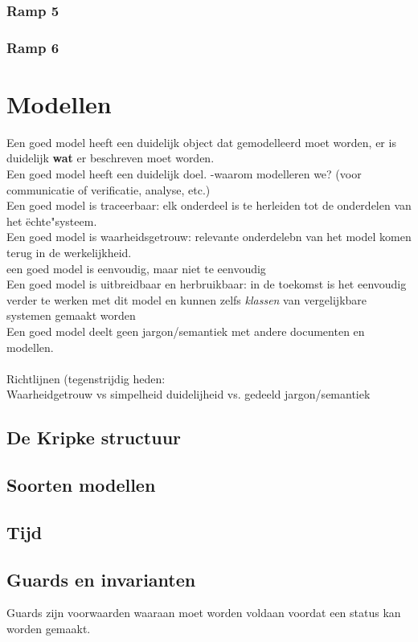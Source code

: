 \documentclass{article}%
\begin{document}
\subsubsection{Ramp 5}
\subsubsection{Ramp 6}

\section{Modellen}
Een goed model heeft een duidelijk object dat gemodelleerd moet worden, er is duidelijk \textbf{wat} er beschreven moet worden.
\\
Een goed model heeft een duidelijk doel.
-waarom modelleren we? (voor communicatie of verificatie, analyse, etc.)
\\
Een goed model is traceerbaar: elk onderdeel is te herleiden tot de onderdelen van het ëchte"systeem.
\\
Een goed model is waarheidsgetrouw: relevante onderdelebn van het model komen terug in de werkelijkheid.
\\
een goed model is eenvoudig, maar niet te eenvoudig
\\
Een goed model is uitbreidbaar en herbruikbaar: in de toekomst is het eenvoudig verder te werken met dit model en kunnen zelfs \textit{klassen} van vergelijkbare  systemen gemaakt worden
\\
Een goed model deelt geen jargon/semantiek met andere documenten en modellen.
\\\\
Richtlijnen (tegenstrijdig heden:
\\
Waarheidgetrouw vs simpelheid
duidelijheid vs. gedeeld jargon/semantiek
\subsection{De Kripke structuur}

\subsection{Soorten modellen}

\subsection{Tijd}

\subsection{Guards en invarianten}
Guards zijn voorwaarden waaraan moet worden voldaan voordat een status kan worden gemaakt.
\end{document}
